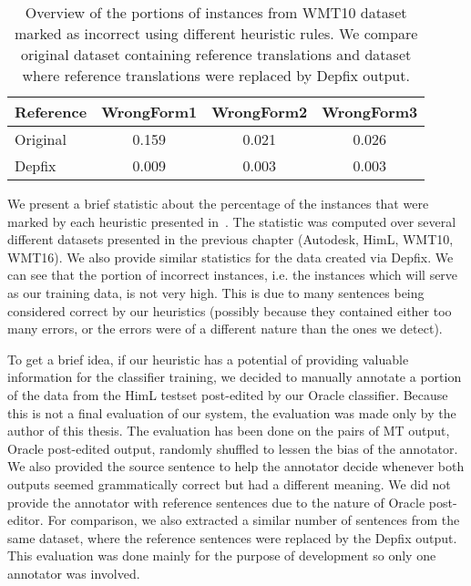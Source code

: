 \begin{table*}[t]
\centering
\small

\begin{tabular}{lccc}
Reference  &  WrongForm1  &  WrongForm2  &  WrongForm3  \\
\hline
Original  &  0.159  &  0.021  &  0.026  \\
Depfix  & 0.009  &  0.003  &  0.003  \\
\end{tabular}
\caption[Comparison of the heuristic rules]{
Overview of the portions of instances from WMT10 dataset marked as incorrect using different heuristic rules.
We compare original dataset containing reference translations and dataset where reference translations
were replaced by Depfix output.
}
\label{marked-stats}
\end{table*}


We present a brief statistic about the percentage of the instances that were marked by each
heuristic presented in~. The statistic was computed over several different
datasets presented in the previous chapter (Autodesk, HimL, WMT10, WMT16). We also provide
similar statistics for the data created via Depfix. We can see that the portion of incorrect instances,
i.e. the instances which will serve as our training data,
is not very high. This is due to many sentences being considered correct by our heuristics (possibly because
they contained either too many errors, or the errors were of a different nature than the ones we detect).

To get a brief idea, if our heuristic has a potential of providing valuable information for the classifier
training, we decided to manually annotate a portion of the data from the HimL testset post-edited by our
Oracle classifier. Because this is not a final evaluation of our system, the evaluation was made only
by the author of this thesis. The evaluation has been done on the pairs of MT output, Oracle post-edited
output, randomly shuffled to lessen the bias of the annotator. We also provided the source sentence
to help the annotator decide whenever both outputs seemed grammatically correct but had a different meaning.
We did not provide the annotator with reference sentences due to the nature of Oracle post-editor. For comparison, we also extracted
a similar number of sentences from the same dataset, where the reference sentences were replaced
by the Depfix output. This evaluation was done mainly for the purpose
of development so only one annotator was involved.

